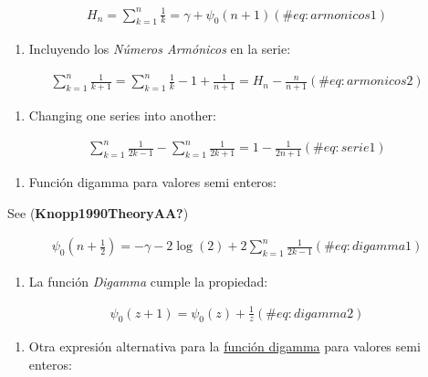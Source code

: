 \documentclass[
  letterpaper,
  DIV=11,
  numbers=noendperiod]{scrreprt}
\providecommand{\tightlist}{%
  \setlength{\itemsep}{0pt}\setlength{\parskip}{0pt}}\usepackage{longtable,booktabs,array}
\begin{document}
\begin{multline}
H_{n}=\sum_{k=1}^n {\frac{1}{k}}=\gamma+\psi_{0}(n+1)
(\#eq:armonicos1)
\end{multline}

\begin{enumerate}
\def\labelenumi{(\roman{enumi})}
\setcounter{enumi}{1}
\tightlist
\item
  Incluyendo los \emph{Números Armónicos} en la serie:
\end{enumerate}

\begin{multline}
\sum_{k=1}^{n}{\frac{1}{k+1}}
= \sum_{k=1}^{n}{\frac{1}{k}}-1+\frac{1}{n+1}=H_{n}-\frac{n}{n+1}
(\#eq:armonicos2)
\end{multline}

\begin{enumerate}
\def\labelenumi{(\roman{enumi})}
\setcounter{enumi}{2}
\tightlist
\item
  Changing one series into another:
\end{enumerate}

\begin{multline}
\sum_{k=1}^{n}{\frac{1}{2k-1}} -\sum_{k=1}^{n}{\frac{1}{2k+1}} =
1-\frac{1}{2n+1}
(\#eq:serie1)
\end{multline}

\begin{enumerate}
\def\labelenumi{(\roman{enumi})}
\setcounter{enumi}{3}
\tightlist
\item
  Función digamma para valores semi enteros:
\end{enumerate}

See (\textbf{Knopp1990TheoryAA?})

\begin{multline}
\psi_{0}(n+\frac{1}{2}) = -\gamma-2\log(2)+2\sum_{k=1}^n{\frac{1}{2k-1}}
(\#eq:digamma1)
\end{multline}

\begin{enumerate}
\def\labelenumi{(\alph{enumi})}
\setcounter{enumi}{21}
\tightlist
\item
  La función \emph{Digamma} cumple la propiedad:
\end{enumerate}

\begin{multline}
\psi_{0}(z+1)= \psi_{0}(z)+\frac{1}{z}
(\#eq:digamma2)
\end{multline}

\begin{enumerate}
\def\labelenumi{(\roman{enumi})}
\setcounter{enumi}{5}
\tightlist
\item
  Otra expresión alternativa para la
  \href{https://mathworld.wolfram.com/DigammaFunction.html}{función
  digamma} para valores semi enteros:
\end{enumerate}
\end{document}
